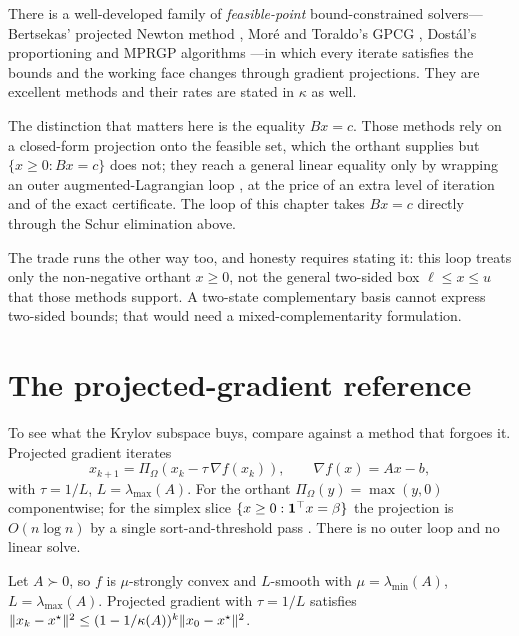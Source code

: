 \begin{remark}
\label{rem:feasible}
There is a well-developed family of \emph{feasible-point} bound-constrained
solvers---Bertsekas' projected Newton method \cite{bertsekas1982}, Moré and
Toraldo's GPCG \cite{moretoraldo1991}, Dostál's proportioning and MPRGP algorithms
\cite{dostal1997,dostalschoberl2005}---in which every iterate satisfies the bounds
and the working face changes through gradient projections. They are excellent
methods and their rates are stated in $\kappa$ as well.

The distinction that matters here is the equality $Bx = c$. Those methods rely on a
closed-form projection onto the feasible set, which the orthant supplies but
$\{x\ge0 : Bx=c\}$ does not; they reach a general linear equality only by wrapping
an outer augmented-Lagrangian loop \cite{dostal2006smalbe}, at the price of an extra
level of iteration and of the exact certificate. The loop of this chapter takes
$Bx = c$ directly through the Schur elimination above.

The trade runs the other way too, and honesty requires stating it: this loop treats
only the non-negative orthant $x \ge 0$, not the general two-sided box
$\ell \le x \le u$ that those methods support. A two-state complementary basis
cannot express two-sided bounds; that would need a mixed-complementarity
formulation.
\end{remark}

\section{The projected-gradient reference}
\label{sec:projgrad}

To see what the Krylov subspace buys, compare against a method that forgoes it.
Projected gradient iterates
\[
  x_{k+1} = \Pi_\Omega\!\left(x_k - \tau\,\nabla f(x_k)\right),
  \qquad \nabla f(x) = A x - b,
\]
with $\tau = 1/L$, $L = \lambda_{\max}(A)$. For the orthant
$\Pi_\Omega(y) = \max(y,0)$ componentwise; for the simplex slice
$\{x \ge 0 : \mathbf{1}^{\top} x = \beta\}$ the projection is $O(n\log n)$ by a single
sort-and-threshold pass \cite{duchi2008,condat2016}. There is no outer loop and no
linear solve.

\begin{proposition}
\label{prop:proj}
Let $A \succ 0$, so $f$ is $\mu$-strongly convex and $L$-smooth with
$\mu = \lambda_{\min}(A)$, $L = \lambda_{\max}(A)$. Projected gradient with
$\tau = 1/L$ satisfies
$\lVert x_k - x^\star \rVert^2 \le (1 - 1/\kappa(A))^{k}\lVert x_0 - x^\star \rVert^2$.
\end{proposition}

